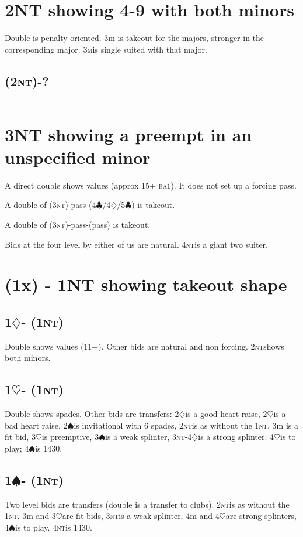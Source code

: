 \documentclass{article}
\newcommand{\bal}{\textsc{bal}}
\renewcommand{\c}{\ensuremath{\clubsuit}}
\renewcommand{\d}{\ensuremath{\diamondsuit}}
\newcommand{\h}{\ensuremath{\heartsuit}}
\newcommand{\s}{\ensuremath{\spadesuit}}
\newcommand{\nt}{\textsc{nt}}
\newcommand{\+}{\ensuremath{^+}}
\newcommand{\M}{\textsc{m}}
\begin{document}
\section{2NT showing 4-9 with both minors}

Double is penalty oriented.  3m is takeout for the majors, stronger in the corresponding major.  3\M is single suited with that major.
\subsection{(2\nt)-?}
\begin{tabular}{llllll}

\end{tabular}

\section{3NT showing a preempt in an unspecified minor}
A direct double shows values (approx 15+ \bal).  It does not set up a forcing pass.

A double of (3\nt)-pass-(4\c/4\d/5\c) is takeout.

A double of (3\nt)-pass-(pass) is takeout.

Bids at the four level by either of us are natural. 4\nt is a giant two suiter.

\section{(1x) - 1NT showing takeout shape}

\subsection{1\d - (1\nt)}
Double shows values (11+).  Other bids are natural and non forcing.  2\nt shows both minors.

\subsection{1\h - (1\nt)}
Double shows spades.  Other bids are transfers: 2\d is a good heart raise, 2\h is a bad heart raise.  2\s is invitational with 6 spades, 2\nt is as without the 1\nt.  3m is a fit bid, 3\h is preemptive, 3\s is a weak splinter, 3\nt-4\d is a strong splinter.  4\h is to play; 4\s is 1430.

\subsection{1\s - (1\nt)}
Two level bids are transfers (double is a transfer to clubs).  2\nt is as without the 1\nt.  3m and 3\h are fit bids, 3\nt is a weak splinter, 4m and 4\h are strong splinters, 4\s is to play.  4\nt is 1430.
\end{document}
